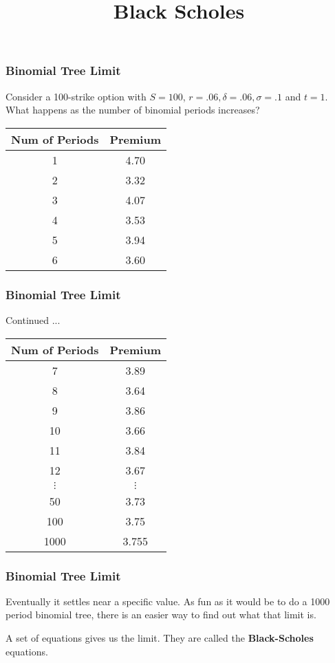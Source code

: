 \documentclass{beamer}
\title{Black Scholes}
\author{}
\date{}
\begin{document}
\maketitle

\begin{frame}
\frametitle{Binomial Tree Limit}

Consider a 100-strike option with $S=100$, $r = .06, \delta = .06, \sigma = .1$ and $t=1$. What happens as the number of binomial periods increases?

\begin{table}
\centering
\begin{tabular}{|c|c|}
\hline
Num of Periods & Premium \\ \hline
1 & 4.70 \\ \hline
2 & 3.32 \\ \hline
3 & 4.07 \\ \hline
4 & 3.53 \\ \hline
5 & 3.94 \\ \hline
6 & 3.60 \\ \hline
\end{tabular}
\end{table}

\end{frame}

\begin{frame}
\frametitle{Binomial Tree Limit}

Continued ...
\begin{table}
\centering
\begin{tabular}{|c|c|}
\hline
Num of Periods & Premium \\ \hline
7 & 3.89 \\ \hline
8 & 3.64 \\ \hline
9 & 3.86 \\ \hline
10 & 3.66 \\ \hline
11 & 3.84 \\ \hline
12 & 3.67 \\ \hline
$\vdots$ & $\vdots$ \\ \hline
50 & 3.73 \\ \hline
100 & 3.75 \\ \hline
1000 & 3.755 \\ \hline
\end{tabular}
\end{table}

\end{frame}

\begin{frame}
\frametitle{Binomial Tree Limit}

Eventually it settles near a specific value. As fun as it would be to
do a 1000 period binomial tree, there is an easier way to  find out
what that limit is.

\vspace{2 cm}

A set of equations gives us the limit. They are called the \textbf{Black-Scholes} equations.

\end{frame}
\end{document}
